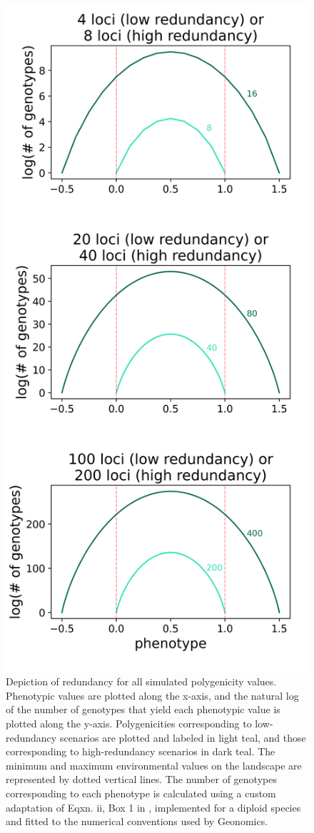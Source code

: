 \documentclass[9pt,twocolumn,twoside,lineno]{pnas-new}
\begin{document}
\begin{figure}
\centering
\includegraphics[width=.8\linewidth]{redundancy_fig.png}
\caption{Depiction of redundancy for all simulated polygenicity values. Phenotypic values are plotted along the x-axis, and the natural log of the number of genotypes that yield each phenotypic value is plotted along the y-axis. Polygenicities corresponding to low-redundancy scenarios are plotted and labeled in light teal, and those corresponding to high-redundancy scenarios in dark teal. The minimum and maximum environmental values on the landscape are represented by dotted vertical lines. The number of genotypes corresponding to each phenotype is calculated using a custom adaptation of Eqxn. ii, Box 1 in \cite{laruson}, implemented for a diploid species and fitted to the numerical conventions used by Geonomics.
}
\label{fig:S3}
\end{figure}

\end{document}
